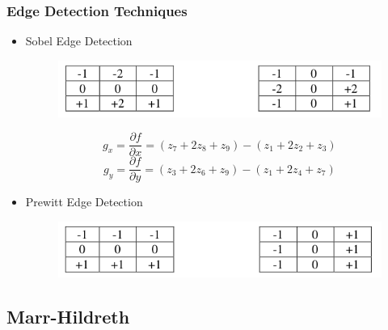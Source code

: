 \documentclass[notheorems,serif,table,compress]{beamer}  %
\begin{document}
\begin{frame}
\frametitle{Edge Detection Techniques}
    \begin{itemize}
        \item Sobel Edge Detection
            \begin{figure}
            \includegraphics[width=0.8\linewidth]{sobel.png} 
            \end{figure}
            \begin{displaymath}
            g_{x}= \frac{\partial f}{\partial x}=(z_{7}+2z_{8}+z_{9})-(z_{1}+2z_{2}+z_{3})
            \end{displaymath}
            \begin{displaymath}
            g_{y}= \frac{\partial f}{\partial y}=(z_{3}+2z_{6}+z_{9})-(z_{1}+2z_{4}+z_{7})
            \end{displaymath}
        \item Prewitt Edge Detection
            \begin{figure}
            \includegraphics[width=0.8\linewidth]{prewitt.png} 
            \end{figure}
    \end{itemize}
\end{frame}


\subsection{Marr-Hildreth}
\end{document}
